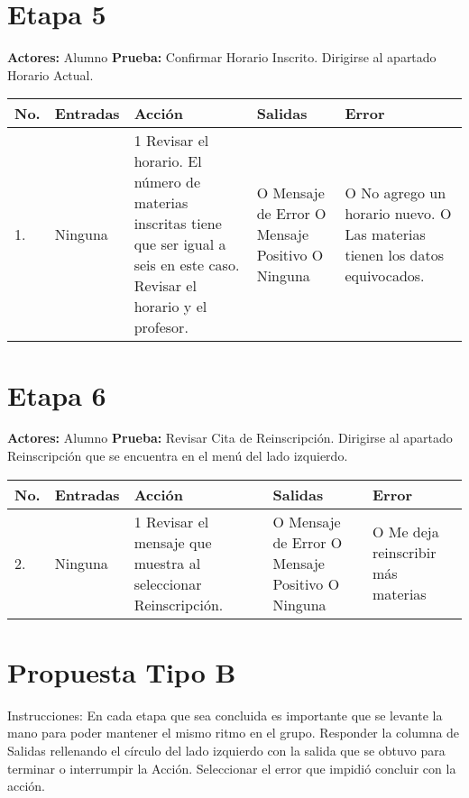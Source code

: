 \section*{Etapa 5}
\textbf{Actores:} Alumno\newline
\textbf{Prueba:} Confirmar Horario Inscrito.\newline
Dirigirse al apartado Horario Actual.
\begin{longtable}{|p{0.7cm}|p{3cm}|p{6cm}|p{2.3cm}|p{3cm}|}
	\hline
	\textbf{No.}
	&
	\textbf{Entradas}	
	&
	\textbf{Acción}
	&
	\textbf{Salidas}
	&
	\textbf{Error}
	\\
	\hline
	1.
	&
	Ninguna	
	&
	1 Revisar el horario.\newline
	2 El número de materias inscritas tiene que ser igual a seis en este caso.\newline
	3 Revisar el horario y el profesor.
	&
	O Mensaje de Error\newline
 	O Mensaje Positivo\newline
 	O Ninguna	 	
 	&
 	O No agrego un horario nuevo.\newline
 	O Las materias tienen los datos equivocados.\\
 	\hline
\end{longtable}
\newpage
\section*{Etapa 6}
\textbf{Actores:} Alumno\newline
\textbf{Prueba:} Revisar Cita de Reinscripción.\newline
Dirigirse al apartado Reinscripción que se encuentra en el menú del lado izquierdo.
\begin{longtable}{|p{0.7cm}|p{3cm}|p{6cm}|p{2.3cm}|p{3cm}|}
	\hline
	\textbf{No.}
	&
	\textbf{Entradas}	
	&
	\textbf{Acción}
	&
	\textbf{Salidas}
	&
	\textbf{Error}
	\\
	\hline
	2.
	&
	Ninguna	
	&
	1 Revisar el mensaje que muestra al seleccionar Reinscripción. 	
	&
	O Mensaje de Error\newline
 	O Mensaje Positivo\newline
 	O Ninguna	 	
 	&
 	O Me deja reinscribir más materias\\
 	\hline
\end{longtable}
\newpage
\section{Propuesta Tipo B}
Instrucciones: En cada etapa que sea concluida es importante que se levante la mano para poder mantener el mismo ritmo en el grupo. Responder la columna de Salidas rellenando el círculo del lado izquierdo con la salida que se obtuvo para terminar o interrumpir la Acción. Seleccionar el error que impidió concluir con la acción.
